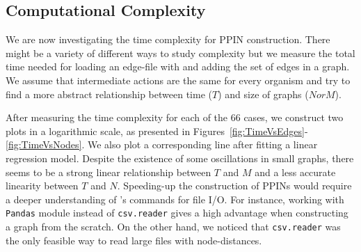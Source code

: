 \subsection{Computational Complexity}
We are now investigating the time complexity for PPIN construction. There might be a variety of different ways  to study complexity but we measure the total time needed for loading an edge-file with \PY and adding the set of edges in a \NX graph. We assume that intermediate actions are the same for every organism and try to find a more abstract relationship between time ($T$) and size of graphs ($N or M$).

After measuring the time complexity for each of the  $66$ cases, we construct two plots in a logarithmic scale, as presented in Figures~\ref{fig:TimeVsEdges}-\ref{fig:TimeVsNodes}. We also plot a corresponding line after fitting a linear regression model. Despite the existence of some oscillations in small graphs, there seems to be a strong linear relationship between $T$ and $M$ and a less accurate linearity between $T$ and $N$. Speeding-up the construction of PPINs would require a deeper understanding of \PY's commands for file I/O. For instance, working with \texttt{Pandas} module instead of \texttt{csv.reader} gives a high advantage when constructing a graph from the scratch. On the other hand, we noticed that \texttt{csv.reader} was the only feasible way to read large files with node-distances. 

